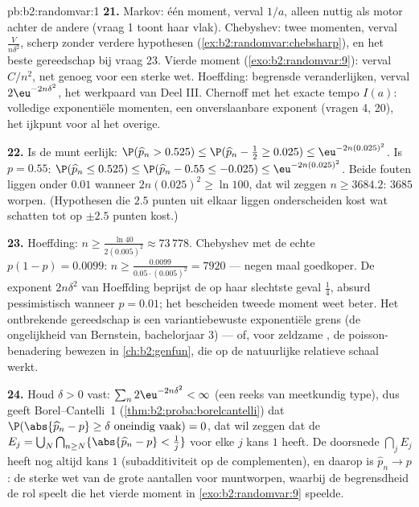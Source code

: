 \begin{solution}{pb:b2:randomvar:1}
\textbf{21.} Markov: één moment, verval $1/a$, alleen nuttig als
motor achter de andere (vraag 1 toont haar vlak). Chebyshev: twee
momenten, verval $\frac{V}{n\delta^2}$, scherp zonder verdere
hypothesen (\cref{ex:b2:randomvar:chebsharp}), en het beste
gereedschap bij vraag 23. Vierde moment
(\cref{exo:b2:randomvar:9}): verval $C/n^2$, net genoeg
 voor een sterke wet. Hoeffding: begrensde
veranderlijken, verval $2\eu^{-2n\delta^2}$, het werkpaard van Deel
III. Chernoff met het exacte tempo $I(a)$: volledige exponentiële
momenten, een onverslaanbare exponent (vragen 4, 20), het
ijkpunt voor al het overige.

\textbf{22.} Is de munt eerlijk: $\P(\widehat p_n > 0.525) \leq
\P(\widehat p_n - \tfrac12 \geq 0.025) \leq \eu^{-2n(0.025)^2}$. Is
$p = 0.55$: $\P(\widehat p_n \leq 0.525) \leq \P(\widehat p_n -
0.55 \leq -0.025) \leq \eu^{-2n(0.025)^2}$. Beide fouten liggen
onder $0.01$ wanneer $2n(0.025)^2 \geq \ln 100$, dat wil zeggen $n
\geq 3684.2$: $3685$ worpen. (Hypothesen die $2.5$ punten uit
elkaar liggen onderscheiden kost wat schatten tot op $\pm2.5$
punten kost.)

\textbf{23.} Hoeffding: $n \geq \frac{\ln 40}{2(0.005)^2} \approx
73\,778$. Chebyshev met de echte  $p(1-p) = 0.0099$: $n
\geq \frac{0.0099}{0.05\cdot(0.005)^2} = 7920$ --- negen maal
goedkoper. De exponent $2n\delta^2$ van Hoeffding beprijst de
 op haar slechtste geval $\frac14$, absurd pessimistisch
wanneer $p = 0.01$; het bescheiden tweede moment weet beter. Het
ontbrekende gereedschap is een variantiebewuste exponentiële grens
(de ongelijkheid van Bernstein, bachelorjaar 3) --- of, voor
zeldzame , de poisson-benadering bewezen in
\cref{ch:b2:genfun}, die op de natuurlijke relatieve schaal
werkt.

\textbf{24.} Houd $\delta > 0$ vast: $\sum_n 2\eu^{-2n\delta^2} <
\infty$ (een reeks van meetkundig type), dus geeft
Borel--Cantelli~1 (\cref{thm:b2:proba:borelcantelli}) dat
$\P(\abs{\widehat p_n - p} \geq \delta \text{ oneindig vaak}) = 0$,
dat wil zeggen dat de  $E_j =
\bigcup_N\bigcap_{n\geq N}\{\abs{\widehat p_n - p} < \tfrac1j\}$
voor elke $j$ kans $1$ heeft. De  doorsnede
$\bigcap_jE_j$ heeft nog altijd kans $1$ (subadditiviteit op de
complementen), en daarop is $\widehat p_n \to p$: de sterke wet van
de grote aantallen voor muntworpen, waarbij de begrensdheid de rol
speelt die het vierde moment in \cref{exo:b2:randomvar:9} speelde.


\end{solution}
